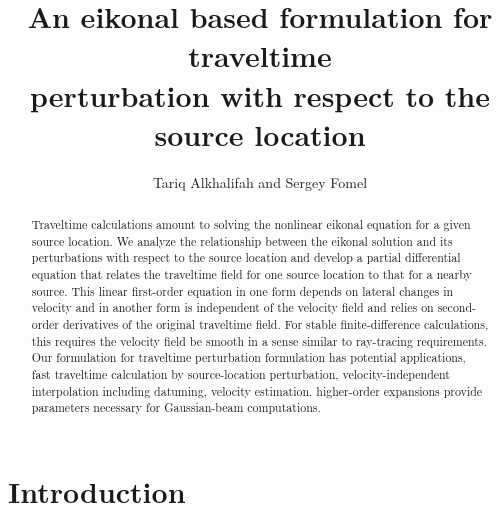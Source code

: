 

\def\bea{\begin{eqnarray}}
\def\eea{  \end{eqnarray}}

\title{An eikonal based formulation for traveltime  \\ perturbation with respect to the source location}


\author{Tariq Alkhalifah and Sergey Fomel}

\maketitle

\begin{abstract}
  Traveltime calculations amount to solving the nonlinear eikonal
  equation for a given source location. We analyze the relationship
  between the eikonal solution and its perturbations with respect to
  the source location and develop a partial differential equation that
  relates the traveltime field for one source location to that for a
  nearby source.  This linear first-order equation in one form depends
  on lateral changes in velocity and in another form is independent of
  the velocity field and relies on second-order derivatives of the
  original traveltime field. For stable finite-difference
  calculations, this requires  the velocity field 
  be smooth in a sense similar to ray-tracing requirements. Our
  formulation for traveltime perturbation formulation has 
   potential applications,   fast traveltime calculation by source-location
  perturbation,  velocity-independent
  interpolation including datuming,  
  velocity estimation.   higher-order
  expansions provide parameters necessary for Gaussian-beam
  computations.
\end{abstract}


\section{Introduction}

